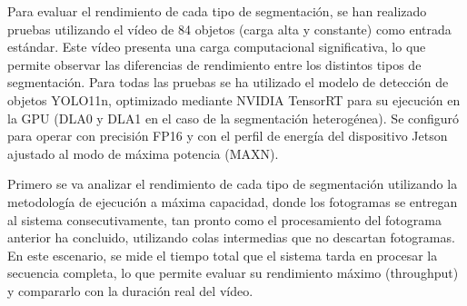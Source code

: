 \documentclass[11pt,spanish,listoffigures,listoftables]{tfgetsinf}
\begin{document}
Para evaluar el rendimiento de cada tipo de segmentación, se han realizado pruebas utilizando el vídeo de 84 objetos (carga alta y constante) como entrada estándar. Este vídeo presenta una carga computacional significativa, lo que permite observar las diferencias de rendimiento entre los distintos tipos de segmentación. Para todas las pruebas se ha utilizado el modelo de detección de objetos YOLO11n, optimizado mediante NVIDIA TensorRT para su ejecución en la GPU (DLA0 y DLA1 en el caso de la segmentación heterogénea). Se configuró para operar con precisión FP16 y con el perfil de energía del dispositivo Jetson ajustado al modo de máxima potencia (MAXN).


Primero se va analizar el rendimiento de cada tipo de segmentación utilizando la metodología de ejecución a máxima capacidad, donde los fotogramas se entregan al sistema consecutivamente, tan pronto como el procesamiento del fotograma anterior ha concluido, utilizando colas intermedias que no descartan fotogramas. En este escenario, se mide el tiempo total que el sistema tarda en procesar la secuencia completa, lo que permite evaluar su rendimiento máximo (throughput) y compararlo con la duración real del vídeo.
\end{document}
